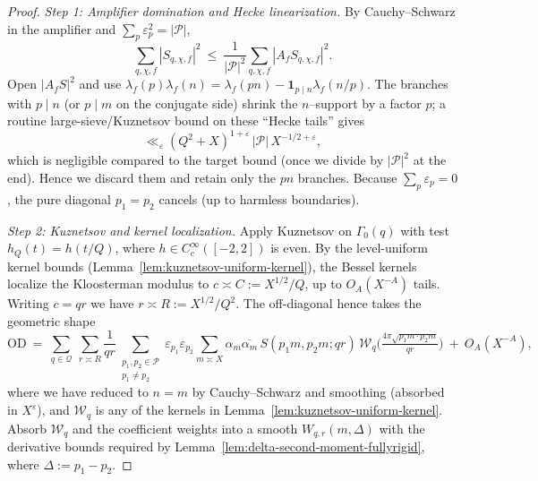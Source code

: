 \documentclass[11pt]{article}
\theoremstyle{definition}
\theoremstyle{remark}
\numberwithin{equation}{part}
\begin{document}
\begin{proof}
	\emph{Step 1: Amplifier domination and Hecke linearization.}
	By Cauchy–Schwarz in the amplifier and $\sum_p\varepsilon_p^2=|\mathcal P|$,
	\[
		\sum_{q,\chi,f} |S_{q,\chi,f}|^2 \ \le\ \frac{1}{|\mathcal P|^2}\sum_{q,\chi,f}|A_f S_{q,\chi,f}|^2.
	\]
	Open $|A_f S|^2$ and use $\lambda_f(p)\lambda_f(n)=\lambda_f(pn)-\mathbf 1_{p\mid n}\lambda_f(n/p)$.
	The branches with $p\mid n$ (or $p\mid m$ on the conjugate side) shrink the $n$–support by a factor $p$; a routine large-sieve/Kuznetsov bound on these “Hecke tails” gives
	\[
		\ll_\varepsilon (Q^2+X)^{1+\varepsilon}\,|\mathcal P|\,X^{-1/2+\varepsilon},
	\]
	which is negligible compared to the target bound (once we divide by $|\mathcal P|^2$ at the end). Hence we discard them and retain only the $pn$ branches. Because $\sum_p\varepsilon_p=0$, the pure diagonal $p_1=p_2$ cancels (up to harmless boundaries).

	\emph{Step 2: Kuznetsov and kernel localization.}
	Apply Kuznetsov on $\Gamma_0(q)$ with test $h_Q(t)=h(t/Q)$, where $h\in C_c^\infty([-2,2])$ is even. By the level-uniform kernel bounds (Lemma~\ref{lem:kuznetsov-uniform-kernel}), the Bessel kernels localize the Kloosterman modulus to $c\asymp C:=X^{1/2}/Q$, up to $O_A(X^{-A})$ tails. Writing $c=qr$ we have $r\asymp R:=X^{1/2}/Q^2$. The off-diagonal hence takes the geometric shape
	\[
		\mathrm{OD}\ =\ \sum_{q\in\mathcal Q}\ \sum_{r\asymp R}\frac{1}{qr}
		\sum_{\substack{p_1,p_2\in\mathcal P\\ p_1\ne p_2}}\varepsilon_{p_1}\varepsilon_{p_2}
		\sum_{m\asymp X}\alpha_m\overline{\alpha_m}\,
		S(p_1 m, p_2 m; qr)\,
		\mathcal W_q\!\Big(\tfrac{4\pi\sqrt{p_1 m\cdot p_2 m}}{qr}\Big)
		\ +\ O_A(X^{-A}),
	\]
	where we have reduced to $n=m$ by Cauchy–Schwarz and smoothing (absorbed in $X^\varepsilon$), and $\mathcal W_q$ is any of the kernels in Lemma~\ref{lem:kuznetsov-uniform-kernel}. Absorb $\mathcal W_q$ and the coefficient weights into a smooth $W_{q,r}(m,\Delta)$ with the derivative bounds required by Lemma~\ref{lem:delta-second-moment-fullyrigid}, where $\Delta:=p_1-p_2$.


\end{proof}
\end{document}
